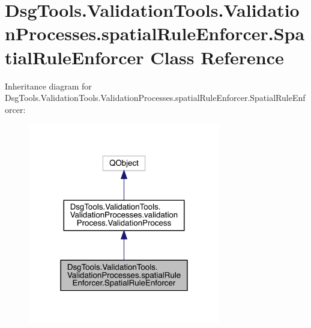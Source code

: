 \hypertarget{class_dsg_tools_1_1_validation_tools_1_1_validation_processes_1_1spatial_rule_enforcer_1_1_spatial_rule_enforcer}{}\section{Dsg\+Tools.\+Validation\+Tools.\+Validation\+Processes.\+spatial\+Rule\+Enforcer.\+Spatial\+Rule\+Enforcer Class Reference}
\label{class_dsg_tools_1_1_validation_tools_1_1_validation_processes_1_1spatial_rule_enforcer_1_1_spatial_rule_enforcer}


Inheritance diagram for Dsg\+Tools.\+Validation\+Tools.\+Validation\+Processes.\+spatial\+Rule\+Enforcer.\+Spatial\+Rule\+Enforcer\+:
\nopagebreak
\begin{figure}[H]
\begin{center}
\leavevmode
\includegraphics[width=238pt]{class_dsg_tools_1_1_validation_tools_1_1_validation_processes_1_1spatial_rule_enforcer_1_1_spati0a763ab2bd449da4973f6b754a748eef}
\end{center}
\end{figure}



